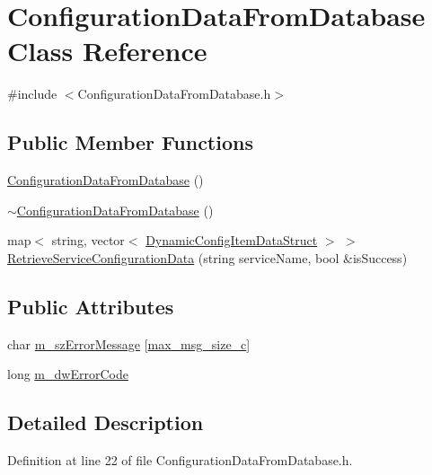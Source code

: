 \hypertarget{classConfigurationDataFromDatabase}{}\section{Configuration\+Data\+From\+Database Class Reference}
\label{classConfigurationDataFromDatabase}


{\ttfamily \#include $<$Configuration\+Data\+From\+Database.\+h$>$}

\subsection*{Public Member Functions}
\begin{DoxyCompactItemize}
\item 
\hyperlink{classConfigurationDataFromDatabase_a6c0e423623ede29421d9678288decc21}{Configuration\+Data\+From\+Database} ()
\item 
\hyperlink{classConfigurationDataFromDatabase_a2d769374c9a11cb9a2b4678a89995da9}{$\sim$\+Configuration\+Data\+From\+Database} ()
\item 
map$<$ string, vector$<$ \hyperlink{structDynamicConfigItemDataStruct}{Dynamic\+Config\+Item\+Data\+Struct} $>$ $>$ \hyperlink{classConfigurationDataFromDatabase_a5f9c07b2e4bf331a2e06c3ac226b2dd7}{Retrieve\+Service\+Configuration\+Data} (string service\+Name, bool \&is\+Success)
\end{DoxyCompactItemize}
\subsection*{Public Attributes}
\begin{DoxyCompactItemize}
\item 
char \hyperlink{classConfigurationDataFromDatabase_aac7ca30370d501a0a55681c6174f906b}{m\+\_\+sz\+Error\+Message} \mbox{[}\hyperlink{ConfigurationDataFromDatabase_8h_a6e392370bd440c3edd8c168172e1ea08}{max\+\_\+msg\+\_\+size\+\_\+c}\mbox{]}
\item 
long \hyperlink{classConfigurationDataFromDatabase_a20f590ac28d74a441f0cecedff273392}{m\+\_\+dw\+Error\+Code}
\end{DoxyCompactItemize}


\subsection{Detailed Description}


Definition at line 22 of file Configuration\+Data\+From\+Database.\+h.



